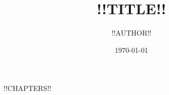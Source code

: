 \documentclass[chapter, a4paper]{oblivoir}
\title{\Huge !!TITLE!!}
\author{!!AUTHOR!!}
\date{\today}
\begin{document}
    \maketitle
    \tableofcontents
    \clearpage
    !!CHAPTERS!!
    \printbibliography[title=참고문헌]
\end{document}
